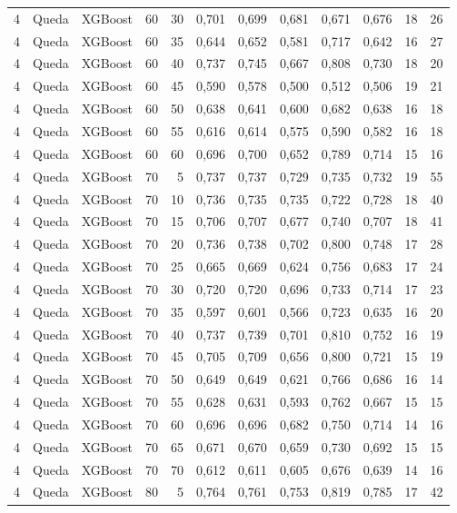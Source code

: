 \begin{longtable}{@{}rllrrrrrrrrr@{}}
4 & Queda & XGBoost & 60 & 30 & 0,701 & 0,699 & 0,681 & 0,671 & 0,676 & 18 & 26 \\
4 & Queda & XGBoost & 60 & 35 & 0,644 & 0,652 & 0,581 & 0,717 & 0,642 & 16 & 27 \\
4 & Queda & XGBoost & 60 & 40 & 0,737 & 0,745 & 0,667 & 0,808 & 0,730 & 18 & 20 \\
4 & Queda & XGBoost & 60 & 45 & 0,590 & 0,578 & 0,500 & 0,512 & 0,506 & 19 & 21 \\
4 & Queda & XGBoost & 60 & 50 & 0,638 & 0,641 & 0,600 & 0,682 & 0,638 & 16 & 18 \\
4 & Queda & XGBoost & 60 & 55 & 0,616 & 0,614 & 0,575 & 0,590 & 0,582 & 16 & 18 \\
4 & Queda & XGBoost & 60 & 60 & 0,696 & 0,700 & 0,652 & 0,789 & 0,714 & 15 & 16 \\
4 & Queda & XGBoost & 70 & 5 & 0,737 & 0,737 & 0,729 & 0,735 & 0,732 & 19 & 55 \\
4 & Queda & XGBoost & 70 & 10 & 0,736 & 0,735 & 0,735 & 0,722 & 0,728 & 18 & 40 \\
4 & Queda & XGBoost & 70 & 15 & 0,706 & 0,707 & 0,677 & 0,740 & 0,707 & 18 & 41 \\
4 & Queda & XGBoost & 70 & 20 & 0,736 & 0,738 & 0,702 & 0,800 & 0,748 & 17 & 28 \\
4 & Queda & XGBoost & 70 & 25 & 0,665 & 0,669 & 0,624 & 0,756 & 0,683 & 17 & 24 \\
4 & Queda & XGBoost & 70 & 30 & 0,720 & 0,720 & 0,696 & 0,733 & 0,714 & 17 & 23 \\
4 & Queda & XGBoost & 70 & 35 & 0,597 & 0,601 & 0,566 & 0,723 & 0,635 & 16 & 20 \\
4 & Queda & XGBoost & 70 & 40 & 0,737 & 0,739 & 0,701 & 0,810 & 0,752 & 16 & 19 \\
4 & Queda & XGBoost & 70 & 45 & 0,705 & 0,709 & 0,656 & 0,800 & 0,721 & 15 & 19 \\
4 & Queda & XGBoost & 70 & 50 & 0,649 & 0,649 & 0,621 & 0,766 & 0,686 & 16 & 14 \\
4 & Queda & XGBoost & 70 & 55 & 0,628 & 0,631 & 0,593 & 0,762 & 0,667 & 15 & 15 \\
4 & Queda & XGBoost & 70 & 60 & 0,696 & 0,696 & 0,682 & 0,750 & 0,714 & 14 & 16 \\
4 & Queda & XGBoost & 70 & 65 & 0,671 & 0,670 & 0,659 & 0,730 & 0,692 & 15 & 15 \\
4 & Queda & XGBoost & 70 & 70 & 0,612 & 0,611 & 0,605 & 0,676 & 0,639 & 14 & 16 \\
4 & Queda & XGBoost & 80 & 5 & 0,764 & 0,761 & 0,753 & 0,819 & 0,785 & 17 & 42 \\

\end{longtable}
